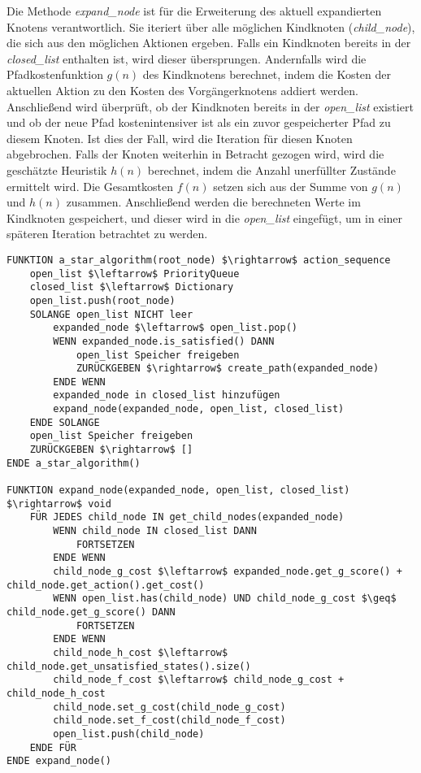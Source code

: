 Die Methode \textit{expand\_node} ist für die Erweiterung des aktuell expandierten Knotens verantwortlich. Sie iteriert über alle möglichen Kindknoten (\textit{child\_node}), die sich aus den möglichen Aktionen ergeben. Falls ein Kindknoten bereits in der \textit{closed\_list} enthalten ist, wird dieser übersprungen. Andernfalls wird die Pfadkostenfunktion $g(n)$ des Kindknotens berechnet, indem die Kosten der aktuellen Aktion zu den Kosten des Vorgängerknotens addiert werden. Anschließend wird überprüft, ob der Kindknoten bereits in der \textit{open\_list} existiert und ob der neue Pfad kostenintensiver ist als ein zuvor gespeicherter Pfad zu diesem Knoten. Ist dies der Fall, wird die Iteration für diesen Knoten abgebrochen. Falls der Knoten weiterhin in Betracht gezogen wird, wird die geschätzte Heuristik $h(n)$ berechnet, indem die Anzahl unerfüllter Zustände ermittelt wird. Die Gesamtkosten $f(n)$ setzen sich aus der Summe von $g(n)$ und $h(n)$ zusammen. Anschließend werden die berechneten Werte im Kindknoten gespeichert, und dieser wird in die \textit{open\_list} eingefügt, um in einer späteren Iteration betrachtet zu werden.

\begin{lstlisting}[language=Pseudo, caption={a\_star\_algorithm Methode}, mathescape=true, label={lst:pseudo astar}]
FUNKTION a_star_algorithm(root_node) $\rightarrow$ action_sequence
	open_list $\leftarrow$ PriorityQueue
	closed_list $\leftarrow$ Dictionary
	open_list.push(root_node)
	SOLANGE open_list NICHT leer
		expanded_node $\leftarrow$ open_list.pop()
		WENN expanded_node.is_satisfied() DANN
			open_list Speicher freigeben
			ZURÜCKGEBEN $\rightarrow$ create_path(expanded_node)
		ENDE WENN
		expanded_node in closed_list hinzufügen
		expand_node(expanded_node, open_list, closed_list)
	ENDE SOLANGE
	open_list Speicher freigeben
	ZURÜCKGEBEN $\rightarrow$ []
ENDE a_star_algorithm()

FUNKTION expand_node(expanded_node, open_list, closed_list) $\rightarrow$ void
	FÜR JEDES child_node IN get_child_nodes(expanded_node)
		WENN child_node IN closed_list DANN
			FORTSETZEN
		ENDE WENN
		child_node_g_cost $\leftarrow$ expanded_node.get_g_score() + child_node.get_action().get_cost()
		WENN open_list.has(child_node) UND child_node_g_cost $\geq$ child_node.get_g_score() DANN
			FORTSETZEN
		ENDE WENN
		child_node_h_cost $\leftarrow$ child_node.get_unsatisfied_states().size()
		child_node_f_cost $\leftarrow$ child_node_g_cost + child_node_h_cost
		child_node.set_g_cost(child_node_g_cost)
		child_node.set_f_cost(child_node_f_cost)
		open_list.push(child_node)
	ENDE FÜR
ENDE expand_node()
\end{lstlisting}





